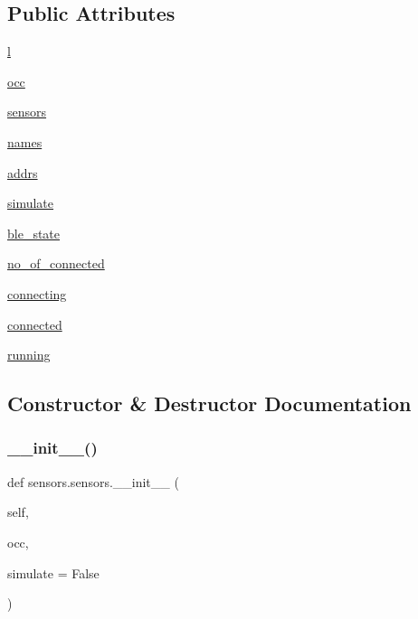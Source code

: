 \subsection*{Public Attributes}
\begin{DoxyCompactItemize}
\item 
\hyperlink{classsensors_1_1sensors_a27d75be18a7fce68b013503cf4519a51}{l}
\item 
\hyperlink{classsensors_1_1sensors_a5bf11f0a0e2c85ca71f0c6b8315fe52e}{occ}
\item 
\hyperlink{classsensors_1_1sensors_a847fa1597b64dec873fb946f51092237}{sensors}
\item 
\hyperlink{classsensors_1_1sensors_afbcf75bb28611a5e9b6a94ef6d5a68bf}{names}
\item 
\hyperlink{classsensors_1_1sensors_a20bd93d21715b480399592487cec59d0}{addrs}
\item 
\hyperlink{classsensors_1_1sensors_a8eba6f72ffd7bafc1175d34212538646}{simulate}
\item 
\hyperlink{classsensors_1_1sensors_af3c2abd825cd9c900148f9bf246df9d5}{ble\+\_\+state}
\item 
\hyperlink{classsensors_1_1sensors_aed7b543a8780e36b29ccc28197373730}{no\+\_\+of\+\_\+connected}
\item 
\hyperlink{classsensors_1_1sensors_abb353abbe46ec306c96974509aa1d235}{connecting}
\item 
\hyperlink{classsensors_1_1sensors_a182807b1ec751728080fda458ca8b294}{connected}
\item 
\hyperlink{classsensors_1_1sensors_a0fb70a27407e5cd15d34d63c4a5a2d39}{running}
\end{DoxyCompactItemize}


\subsection{Constructor \& Destructor Documentation}
\mbox{\label{classsensors_1_1sensors_a88254be26dbf3f0c08e5619d2346c7ad}} 
\subsubsection{\texorpdfstring{\+\_\+\+\_\+init\+\_\+\+\_\+()}{\_\_init\_\_()}}
{\footnotesize\ttfamily def sensors.\+sensors.\+\_\+\+\_\+init\+\_\+\+\_\+ (\begin{DoxyParamCaption}\item[{}]{self,  }\item[{}]{occ,  }\item[{}]{simulate = {\ttfamily False} }\end{DoxyParamCaption})}

